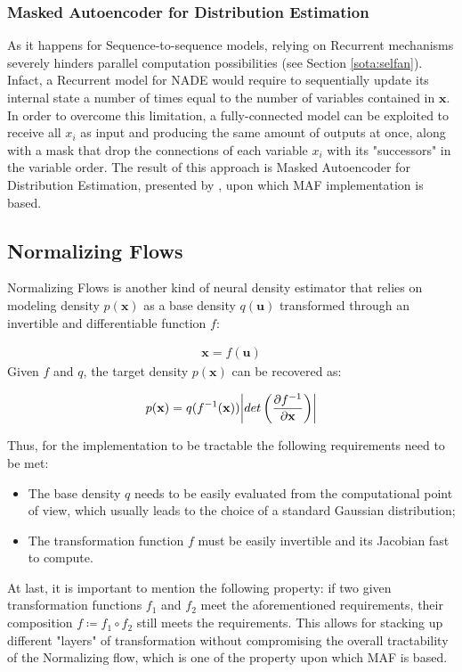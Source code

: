             \subsubsection{Masked Autoencoder for Distribution Estimation}
                As it happens for Sequence-to-sequence models, relying on Recurrent mechanisms severely hinders parallel computation possibilities (see Section \ref{sota:selfan}). Infact, a Recurrent model for NADE would require to sequentially update its internal state a number of times equal to the number of variables contained in $\mathbf{x}$. In order to overcome this limitation, a fully-connected model can be exploited to receive all $x_i$ as input and producing the same amount of outputs at once, along with a mask that drop the connections of each variable $x_i$ with its "successors" in the variable order. The result of this approach is Masked Autoencoder for Distribution Estimation, presented by , upon which MAF implementation is based.
                
        \subsection{Normalizing Flows}
            Normalizing Flows is another kind of neural density estimator that relies on modeling density $p(\mathbf{x})$ as a base density $q(\mathbf{u})$ transformed through an invertible and differentiable function $f$:
            
            \begin{align}
                \mathbf{x} = f \left( \mathbf{u} \right) \label{eq:normflow}
            \end{align}
            Given $f$ and $q$, the target density $p(\mathbf{x})$ can be recovered as:
            
            \[ p(\mathbf{x}) = q(f^{-1}(\mathbf{x})) \abs*{ det \left( \frac{\partial f^{-1}}{\partial \mathbf{x}} \right) } \]
            
            Thus, for the implementation to be tractable the following requirements need to be met:
            \begin{itemize}
                \setlength\itemsep{0.05em}
                \item The base density $q$ needs to be easily evaluated from the computational point of view, which usually leads to the choice of a standard Gaussian distribution;
                \item The transformation function $f$ must be easily invertible and its Jacobian fast to compute.
            \end{itemize}
            At last, it is important to mention the following property: if two given  transformation functions $f_1$ and $f_2$ meet the aforementioned requirements, their composition $f \coloneqq f_1 \circ f_2$ still meets the requirements. This allows for stacking up different "layers" of transformation without compromising the overall tractability of the Normalizing flow, which is one of the property upon which MAF is based.
            
